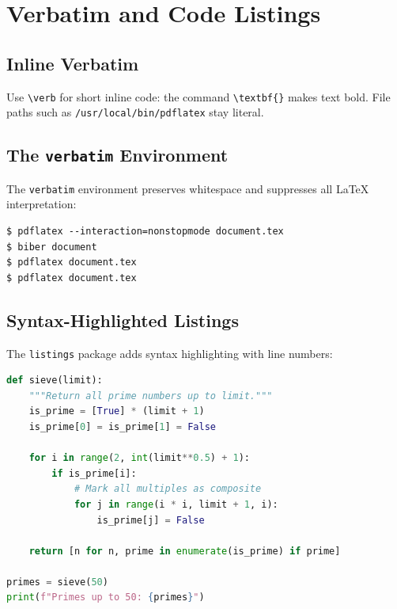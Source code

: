 \documentclass[12pt,a4paper]{article}
\begin{document}

\section{Verbatim and Code Listings}
\label{sec:verbatim}

\subsection{Inline Verbatim}

Use \verb|\verb| for short inline code: the command \verb|\textbf{}| makes
text bold. File paths such as \verb|/usr/local/bin/pdflatex| stay literal.

\subsection{The \texttt{verbatim} Environment}

The \texttt{verbatim} environment preserves whitespace and suppresses
all \LaTeX{} interpretation:

\begin{verbatim}
$ pdflatex --interaction=nonstopmode document.tex
$ biber document
$ pdflatex document.tex
$ pdflatex document.tex
\end{verbatim}

\subsection{Syntax-Highlighted Listings}

The \texttt{listings} package adds syntax highlighting with line numbers:

\begin{lstlisting}[language=Python, caption={Sieve of Eratosthenes}]
def sieve(limit):
    """Return all prime numbers up to limit."""
    is_prime = [True] * (limit + 1)
    is_prime[0] = is_prime[1] = False

    for i in range(2, int(limit**0.5) + 1):
        if is_prime[i]:
            # Mark all multiples as composite
            for j in range(i * i, limit + 1, i):
                is_prime[j] = False

    return [n for n, prime in enumerate(is_prime) if prime]

primes = sieve(50)
print(f"Primes up to 50: {primes}")
\end{lstlisting}
\end{document}
